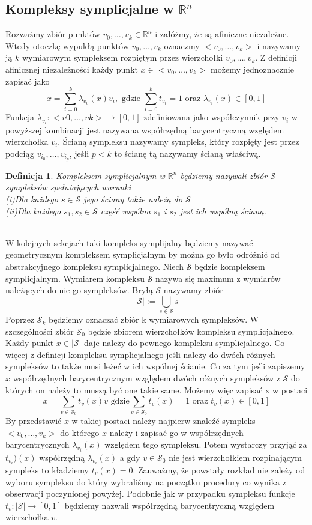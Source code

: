 \documentclass[12pt,a4paper]{article}
\newcommand{\symcom}[1]{\mathcal{#1}}
\newcommand{\fun}[3]{#1:#2 \rightarrow #3}
\newcommand{\Rn}[0]{\mathbb{R}^n}
\newcommand{\gemsym}[2]{\big<#1,	\ldots,#2\big>}
\newtheorem{definition}{Definicja}[section]
\begin{document}
\subsection{Kompleksy symplicjalne w $\Rn$}
Rozważmy zbiór punktów $v_0,\ldots,v_k\in\Rn$ i załóżmy, że są afiniczne niezależne. Wtedy otoczkę wypukłą punktów $v_0,\ldots,v_k$ oznaczmy $\gemsym{v_0}{v_k}$ i nazywamy ją $k$ wymiarowym sympleksem rozpiętym przez wierzchołki $v_0,\ldots,v_k$. Z definicji afinicznej niezależności każdy punkt $x\in\gemsym{v_0}{v_k}$ możemy jednoznacznie zapisać jako
$$x=\sum_{i=0}^{k}\lambda_{v_0}(x)v_i, \text{ gdzie } \sum_{i=0}^{k}t_{v_i}=1 \text{ oraz } \lambda_{v_i}(x)\in[0,1]$$
Funkcja $\fun{\lambda_{v_i}}{\gemsym{v0}{vk}}{[0,1]}$ zdefiniowana jako współczynnik przy $v_i$ w powyższej kombinacji jest nazywana współrzędną barycentryczną względem wierzchołka $v_i$. 
Ścianą sympleksu nazywamy sympleks, który rozpięty jest przez podciąg $v_{i_0},\ldots,v_{i_p}$, jeśli $p<k$ to ścianę tą nazywamy ścianą właściwą. 
\begin{definition}
Kompleksem symplicjalnym w $\Rn$ będziemy nazywali zbiór $\symcom{S}$ sympleksów spełniających warunki
\\(i)Dla każdego $s\in\symcom{S}$ jego ściany także należą do $\symcom{S}$ 
\\(ii)Dla każdego $s_1,s_2\in\symcom{S}$ część wspólna $s_1$ i $s_2$ jest ich wspólną ścianą.
\end{definition} 
\\W kolejnych sekcjach taki kompleks symplijalny będziemy nazywać geometrycznym kompleksem symplicjalnym by można go było odróżnić od abstrakcyjnego kompleksu symplicjalnego.
\noindent
Niech $\symcom{S}$ będzie kompleksem symplicjalnym.
Wymiarem kompleksu $\symcom{S}$ nazywa się maximum z wymiarów należących do nie go sympleksów. Bryłą $\symcom{S}$ nazywamy zbiór
$$|\symcom{S}|:=\bigcup_{s\in\symcom{S}}s$$
Poprzez $\symcom{S}_k$ będziemy oznaczać zbiór k wymiarowych sympleksów. W szczególności zbiór $\symcom{S}_0$ będzie zbiorem wierzchołków kompleksu symplicjalnego. Każdy punkt $x\in{|\symcom{S}|}$ daje należy do pewnego kompleksu symplicjalnego. Co więcej z definicji kompleksu symplicjalnego jeśli należy do dwóch różnych sympleksów to także musi leżeć w ich wspólnej ścianie. Co za tym jeśli zapiszemy $x$ współrzędnych barycentrycznym względem dwóch różnych sympleksów z $\symcom{S}$ do których on należy to muszą być one takie same.  Możemy więc zapisać x w postaci
$$
x=\sum_{v\in \symcom S _0}t_v(x) v\text{ gdzie}\sum_{v\in \symcom S_0}t_v(x) = 1\text{ oraz }t_v(x)\in[0,1]
$$
By przedstawić $x$ w takiej postaci należy najpierw znaleźć sympleks $\gemsym{v_0}{v_k}$ do którego $x$ należy i zapisać go w
współrzędnych barycentrycznych $\lambda_{v_i}(x)$ względem tego sympleksu. Potem wystarczy przyjąć za $t_{v_i})
(x)$ współrzędną $\lambda_{v_i}(x)$ a gdy $v\in\symcom S_0$ nie jest wierzchołkiem rozpinającym sympleks to kładziemy $t_v(x) =0$. Zauważmy, że powstały rozkład nie zależy od wyboru sympleksu do który wybraliśmy na początku procedury co wynika z obserwacji poczynionej powyżej. Podobnie jak w przypadku sympleksu funkcje $\fun{t_v}{|\symcom{S}|}{[0,1]}$ będziemy nazwali współrzędną barycentryczną względem wierzchołka $v$.
\end{document}
